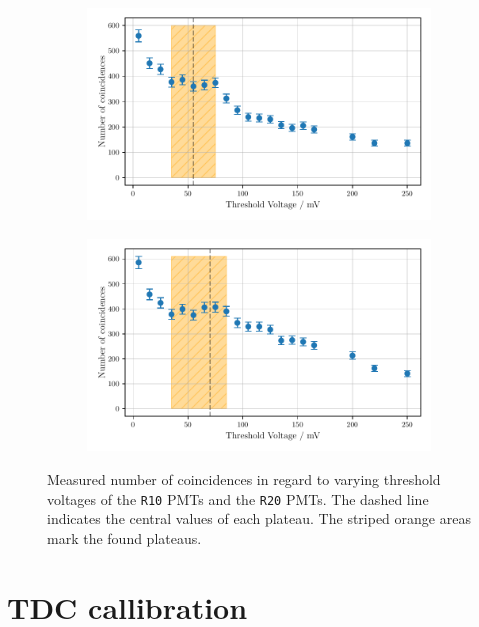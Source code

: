 \begin{figure}
    \centering
    \begin{subfigure}[b]{0.48\textwidth}
    \includegraphics[width=\textwidth]{plots/threshR20.pdf}
\end{subfigure}\hfill
\begin{subfigure}[b]{0.48\textwidth}
    \includegraphics[width=\textwidth]{plots/threshR10.pdf}
\end{subfigure}
\caption{Measured number of coincidences in regard to varying threshold voltages
of the \texttt{R10} PMTs and the \texttt{R20} PMTs.
The dashed line indicates the central values of each plateau. The striped orange areas mark the found plateaus.}
\label{fig:threshR10R20}
\end{figure}
\section{TDC callibration}
